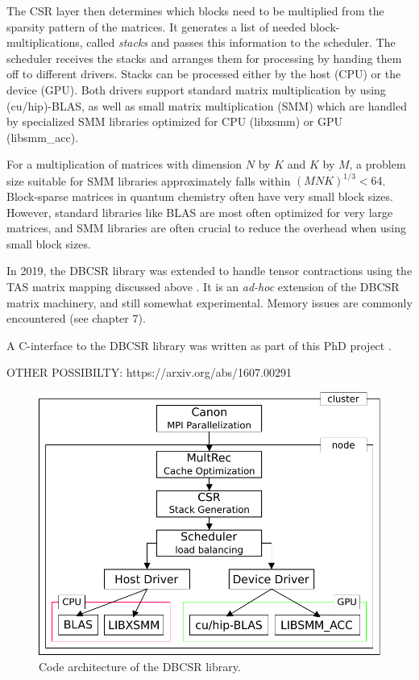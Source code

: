 The CSR layer then determines which blocks need to be multiplied from the sparsity pattern of the matrices. It generates a list of needed block-multiplications, called \emph{stacks} and passes this information to the scheduler. The scheduler receives the stacks and arranges them for processing by handing them off to different drivers. Stacks can be processed either by the host (CPU) or the device (GPU). Both drivers support standard matrix multiplication by using (cu/hip)-BLAS, as well as small matrix multiplication (SMM) which are handled by specialized SMM libraries optimized for CPU (libxsmm) or GPU (libsmm\_acc). 

For a multiplication of matrices with dimension $N$ by $K$ and $K$ by $M$, a problem size suitable for SMM libraries approximately falls within $(MNK)^{1/3} < 64$. Block-sparse matrices in quantum chemistry often have very small block sizes. However, standard libraries like BLAS are most often optimized for very large matrices, and SMM libraries are often crucial to reduce the overhead when using small block sizes. 

In 2019, the DBCSR library  was extended to handle tensor contractions using the TAS matrix mapping discussed above \cite{Siv2019}. It is an \emph{ad-hoc} extension of the DBCSR matrix machinery, and still somewhat experimental. Memory issues are commonly encountered (see chapter 7).

A C-interface to the DBCSR library was written as part of this PhD project \cite{Amb2020}.

OTHER POSSIBILTY: https://arxiv.org/abs/1607.00291

\begin{figure}
\centering
\includegraphics[scale=0.9]{Pics/DBCSRARCH}
\caption{Code architecture of the DBCSR library.}
\label{fig:ARCH}
\end{figure}



